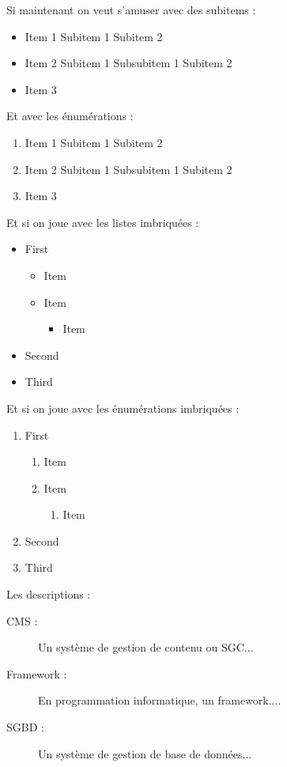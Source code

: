 \documentclass[a4paper,11pt]{report}    %
\begin{document}
Si maintenant on veut s'amuser avec des subitems :
\begin{itemize}
	\item Item 1
	\subitem Subitem 1
	\subitem Subitem 2
	\item Item 2
	\subitem Subitem 1
	\subsubitem Subsubitem 1
	\subitem Subitem 2
	\item Item 3
\end{itemize}

Et avec les énumérations :
\begin{enumerate}
	\item Item 1
	\subitem Subitem 1
	\subitem Subitem 2
	\item Item 2
	\subitem Subitem 1
	\subsubitem Subsubitem 1
	\subitem Subitem 2
	\item Item 3
\end{enumerate}

Et si on joue avec les listes imbriquées :
\begin{itemize}
	\item First
	\begin{itemize}
		\item Item
		\item Item
		\begin{itemize}
			\item Item
		\end{itemize}
	\end{itemize}
	\item Second
	\item Third
\end{itemize}

Et si on joue avec les énumérations imbriquées :
\begin{enumerate}
	\item First
	\begin{enumerate}
		\item Item
		\item Item
		\begin{enumerate}
			\item Item
		\end{enumerate}
	\end{enumerate}
	\item Second
	\item Third
\end{enumerate}

\newpage

Les descriptions :
\begin{description}
	\item[CMS :] Un système de gestion de contenu ou SGC...
	\item[Framework :] En programmation informatique, un framework....
	\item[SGBD :] Un système de gestion de base de données...
\end{description}
\end{document}
